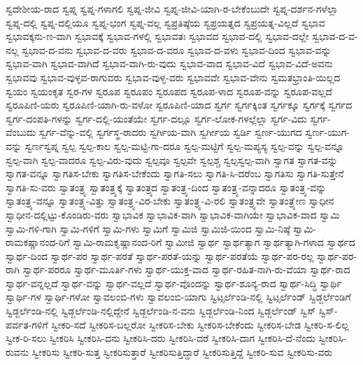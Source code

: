 {ಸ್ವದೇಶೀಯ-ರಾದ
ಸ್ವಪ್ನ
ಸ್ವಪ್ನ-ಗಳಾಗಲಿ
ಸ್ವಪ್ನ-ಜೀವಿ
ಸ್ವಪ್ನ-ಜೀವಿ-ಯಾಗಿ-ರ-ಬೇಕೆಂಬುದೇ
ಸ್ವಪ್ನ-ದರ್ಶನ-ಗಳೆಲ್ಲಾ
ಸ್ವಪ್ನ-ದಲ್ಲಿ
ಸ್ವಪ್ನ-ದಲ್ಲಿಯೂ
ಸ್ವಪ್ನ-ಭಂಗ
ಸ್ವಪ್ನ-ವಲ್ಲ
ಸ್ವಪ್ರತಿಷ್ಠೆಯ
ಸ್ವಪ್ರಯತ್ನದ
ಸ್ವಪ್ರಯತ್ನ-ವಿಲ್ಲದೆ
ಸ್ವಭಾವ
ಸ್ವಭಾವಕ್ಕನು-ಣ-ವಾಗಿ
ಸ್ವಭಾವಕ್ಕೆ
ಸ್ವಭಾವ-ಗಳಲ್ಲಿ
ಸ್ವಭಾವತಃ
ಸ್ವಭಾವದ
ಸ್ವಭಾವ-ದಲ್ಲಿ
ಸ್ವಭಾವ-ದಲ್ಲೇ
ಸ್ವಭಾವ-ದ-ವ-ನಲ್ಲ
ಸ್ವಭಾವ-ದ-ವನು
ಸ್ವಭಾವ-ದ-ವರು
ಸ್ವಭಾವ-ದ-ವರೂ
ಸ್ವಭಾವ-ದ-ವಳು
ಸ್ವಭಾವ-ದಿಂದ
ಸ್ವಭಾವ-ವನ್ನು
ಸ್ವಭಾವ-ವಾಗಿ
ಸ್ವಭಾವ-ವಾಗಿದೆ
ಸ್ವಭಾವ-ವಾಗಿ-ರು-ವುದು
ಸ್ವಭಾವ-ವಾದ
ಸ್ವಭಾವ-ವಿದೆ
ಸ್ವಭಾವ-ವಿದೆ-ಅವನು
ಸ್ವಭಾವವು
ಸ್ವಭಾವ-ವುಳ್ಳವ-ರಾಗುವರು
ಸ್ವಭಾವ-ವುಳ್ಳ-ವರು
ಸ್ವಭಾವವೇ
ಸ್ವಭಾವ-ವೇನು
ಸ್ವಮತಭ್ರಾಂತಿ-ಯಿಲ್ಲದ
ಸ್ವಯಂ
ಸ್ವಯಂಕೃತ
ಸ್ವರ-ಗಳ
ಸ್ವರೂಪ
ಸ್ವರೂಪಂ
ಸ್ವರೂಪದ
ಸ್ವರೂಪ-ಳಾದ
ಸ್ವರೂಪ-ವನ್ನು
ಸ್ವರೂಪ-ವಲ್ಲದೆ
ಸ್ವರೂಪಿಣಿ-ಯರು
ಸ್ವರೂಪಿಣಿ-ಯಾಗಿ-ರು-ವಳೋ
ಸ್ವರೂಪಿಣಿ-ಯಾದ
ಸ್ವರ್ಗ
ಸ್ವರ್ಗಕ್ಕಿಂತ
ಸ್ವರ್ಗಕ್ಕೂ
ಸ್ವರ್ಗಕ್ಕೆ
ಸ್ವರ್ಗದ
ಸ್ವರ್ಗ-ದಂಪತಿ-ಗಳನ್ನು
ಸ್ವರ್ಗ-ದಲ್ಲಿ-ಯಂತೆಯೇ
ಸ್ವರ್ಗ-ದಲ್ಲೂ
ಸ್ವರ್ಗ-ಲೋಕ-ಗಳಲ್ಲೆಲ್ಲಾ
ಸ್ವರ್ಗ-ವಿದು
ಸ್ವರ್ಗ-ವೆಂಬುದು
ಸ್ವರ್ಗ-ವೆನ್ನು-ವಲ್ಲಿ
ಸ್ವರ್ಗಸ್ಥ-ರಾದರು
ಸ್ವರ್ಗಿಯ-ವಾಗಿ
ಸ್ವರ್ಗೀಯ
ಸ್ವರ್ಡಿ
ಸ್ವರ್ಣ-ಯುಗದ
ಸ್ವರ್ಣ-ಯುಗ-ವನ್ನು
ಸ್ವರ್ಣಸ್ವಪ್ನ
ಸ್ವಲ್ಪ
ಸ್ವಲ್ಪ-ಕಾಲ
ಸ್ವಲ್ಪ-ಮಟ್ಟಿ-ಗಾ-ದರೂ
ಸ್ವಲ್ಪ-ಮಟ್ಟಿಗೆ
ಸ್ವಲ್ಪ-ಮಪ್ಯಸ್ಯ
ಸ್ವಲ್ಪ-ವನ್ನು
ಸ್ವಲ್ಪ-ವನ್ನೂ
ಸ್ವಲ್ಪ-ವಾಗಿ
ಸ್ವಲ್ಪ-ವಾದರೂ
ಸ್ವಲ್ಪ-ವಿರು-ವುದು
ಸ್ವಲ್ಪವೂ
ಸ್ವಲ್ಪವೇ
ಸ್ವಲ್ಪಶ್ಚ
ಸ್ವಲ್ಪಸ್ವಲ್ಪ-ವಾಗಿ
ಸ್ವಾಗತ
ಸ್ವಾಗತ-ವನ್ನು
ಸ್ವಾಗತ-ವನ್ನೂ
ಸ್ವಾಗತಿಸ-ಬೇಕು
ಸ್ವಾಗತಿಸ-ಬೇಕೆಂದು
ಸ್ವಾಗತಿ-ಸಲು
ಸ್ವಾಗತಿ-ಸಿ-ದರೆಂಬ
ಸ್ವಾಗತಿಸು
ಸ್ವಾಗತಿ-ಸುತ್ತೇನೆ
ಸ್ವಾಗತಿ-ಸು-ವರು
ಸ್ವಾತಂತ್ರ್ಯ
ಸ್ವಾತಂತ್ರ್ಯಕ್ಕೆ
ಸ್ವಾತಂತ್ರ್ಯದ
ಸ್ವಾತಂತ್ರ್ಯ-ದಿಂದ
ಸ್ವಾತಂತ್ರ್ಯ-ವನ್ನಾದರೂ
ಸ್ವಾತಂತ್ರ್ಯ-ವನ್ನು
ಸ್ವಾತಂತ್ರ್ಯ-ವನ್ನೂ
ಸ್ವಾತಂತ್ರ್ಯ-ವಿತ್ತು
ಸ್ವಾತಂತ್ರ್ಯ-ವಿರ-ಬೇಕು
ಸ್ವಾತಂತ್ರ್ಯ-ವಿ-ರಲಿ
ಸ್ವಾತಂತ್ರ್ಯವೇ
ಸ್ವಾತಂತ್ರ್ಯೇಣ
ಸ್ವಾಧೀನ
ಸ್ವಾಧೀನ-ದಲ್ಲಿಟ್ಟು-ಕೊಂಡಿರು-ವರು
ಸ್ವಾಭಾವಿಕ
ಸ್ವಾಭಾವಿಕ-ವಾಗಿ
ಸ್ವಾಭಾವಿಕ-ವಾಗಿಯೇ
ಸ್ವಾಭಾವಿಕ-ವಾದ
ಸ್ವಾಮಿ
ಸ್ವಾಮಿ-ಗಳಿ-ಗಾಗಿ
ಸ್ವಾಮಿ-ಗಳಿಗೆ
ಸ್ವಾಮಿ-ಗಳು
ಸ್ವಾಮಿಗೆ
ಸ್ವಾಮಿಜಿ
ಸ್ವಾಮಿಜಿ-ಯಿಂದ
ಸ್ವಾಮಿ-ನಿಷ್ಠೆ
ಸ್ವಾಮಿ-ರಾಮಕಷ್ಣಾನಂದ-ರಿಗೆ
ಸ್ವಾಮಿ-ರಾಮಕೃಷ್ಣಾನಂದ-ರಿಗೆ
ಸ್ವಾಮೀಜಿ
ಸ್ವಾರ್ಥ
ಸ್ವಾರ್ಥತ್ಯಾಗ
ಸ್ವಾರ್ಥತ್ಯಾಗಿ-ಗಳಾದ
ಸ್ವಾರ್ಥದ
ಸ್ವಾರ್ಥ-ದಿಂದ
ಸ್ವಾರ್ಥ-ಪರ
ಸ್ವಾರ್ಥ-ಪರತೆ
ಸ್ವಾರ್ಥ-ಪರತೆ-ಯನ್ನು
ಸ್ವಾರ್ಥ-ಪರತೆಯೆ
ಸ್ವಾರ್ಥ-ಪರ-ರಲ್ಲ
ಸ್ವಾರ್ಥ-ಪರ-ರಾಗಿ
ಸ್ವಾರ್ಥ-ಪರರೂ
ಸ್ವಾರ್ಥ-ಮೂರ್ತಿ-ಗಳು
ಸ್ವಾರ್ಥ-ಯುಕ್ತ-ವಾದ
ಸ್ವಾರ್ಥ-ರಹಿತ-ನಾಗಿ-ರು-ವೆಯಾ
ಸ್ವಾರ್ಥ-ರಾದ
ಸ್ವಾರ್ಥ-ವನ್ನಲ್ಲದೆ
ಸ್ವಾರ್ಥ-ವನ್ನು
ಸ್ವಾರ್ಥ-ವಲ್ಲದೆ
ಸ್ವಾರ್ಥ-ವೊಂದನ್ನು
ಸ್ವಾರ್ಥ-ಶೂನ್ಯ-ರಾದ
ಸ್ವಾರ್ಥ-ಸಿದ್ಧಿ
ಸ್ವಾರ್ಥಿ
ಸ್ವಾರ್ಥಿ-ಗಳ
ಸ್ವಾರ್ಥಿ-ಗಳೋ
ಸ್ವಾವಲಂಬಿ-ಗಳು
ಸ್ವಾವಲಂಬಿ-ಯಾಗು
ಸ್ವಿಟ್ಸರ್ಲೆಂಡಿ-ನಲ್ಲಿ
ಸ್ವಿಟ್ಸರ್ಲೆಂಡ್
ಸ್ವಿಡ್ಜರ್ಲೆಂಡಿಗೆ
ಸ್ವಿಡ್ಜರ್ಲೆಂಡಿ-ನಲ್ಲಿ
ಸ್ವಿಡ್ಜರ್ಲೆಂಡಿ-ನಲ್ಲಿದ್ದೇನೆ
ಸ್ವಿಡ್ಜರ್ಲೆಂಡಿ-ನ-ವನು
ಸ್ವಿಡ್ಜರ್ಲೆಂಡಿ-ನಿಂದ
ಸ್ವಿಡ್ಜರ್ಲೆಂಡ್
ಸ್ವಿಸ್
ಸ್ವಿಸ್-ಪರ್ವತ-ಗಳಿಗೆ
ಸ್ವೀಕರಿ-ಸದೆ
ಸ್ವೀಕರಿಸ-ಬಲ್ಲರೋ
ಸ್ವೀಕರಿಸ-ಬೇಕು
ಸ್ವೀಕರಿಸ-ಬೇಕೆಂದು
ಸ್ವೀಕರಿಸ-ಬೇಡ
ಸ್ವೀಕರಿ-ಸ-ಲಿಲ್ಲ
ಸ್ವೀಕ-ರಿ-ಸಲು
ಸ್ವೀಕರಿಸಿ
ಸ್ವೀಕರಿಸಿ-ದನು
ಸ್ವೀಕರಿಸಿ-ದರು
ಸ್ವೀಕರಿಸಿ-ದರೆ
ಸ್ವೀಕರಿಸಿ-ದಾಗ
ಸ್ವೀಕರಿಸಿ-ದೆ-ನೆಂದು
ಸ್ವೀಕರಿಸಿ-ರುವನು
ಸ್ವೀಕರಿಸು
ಸ್ವೀಕರಿ-ಸುತ್ತ
ಸ್ವೀಕರಿಸುತ್ತಾರೆ
ಸ್ವೀಕರಿಸುತ್ತಿದ್ದಾರೆ
ಸ್ವೀಕರಿಸುತ್ತಿದ್ದೆ
ಸ್ವೀಕರಿ-ಸುವ
ಸ್ವೀಕರಿಸು-ವರು
}
